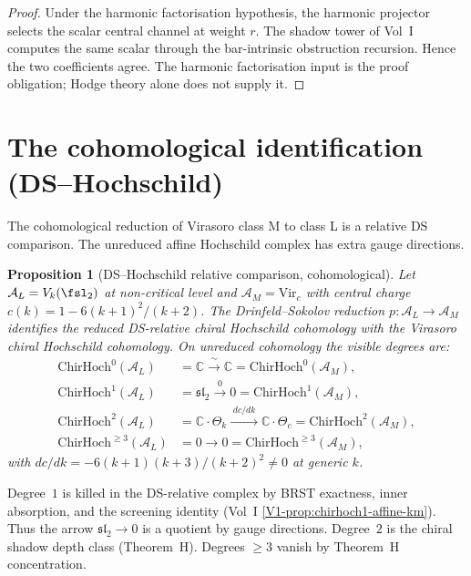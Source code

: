 \documentclass[11pt]{amsart}
\newtheorem{proposition}[theorem]{Proposition}
\theoremstyle{definition}
\theoremstyle{remark}
\providecommand{\ChirHoch}{\mathrm{ChirHoch}}
\providecommand{\cA}{\mathcal{A}}
\begin{document}
\begin{proof}
Under the harmonic factorisation hypothesis, the harmonic projector
selects the scalar central channel at weight $r$. The shadow tower of
Vol~I computes the same scalar through the bar-intrinsic obstruction
recursion. Hence the two coefficients agree. The harmonic
factorisation input is the proof obligation; Hodge theory alone does
not supply it.
\end{proof}

\section{The cohomological identification (DS--Hochschild)}
\label{sec:DS-Hochschild-cohom}

The cohomological reduction of Virasoro class M to class L is a
relative DS comparison.  The unreduced affine Hochschild complex has
extra gauge directions.

\begin{proposition}[DS--Hochschild relative comparison, cohomological]%
\label{prop:DS-Hochschild-cohom}%
Let $\cA_L = V_k(\fsl_2)$ at non-critical level and
$\cA_M = \mathrm{Vir}_c$ with central charge
$c(k) = 1 - 6(k+1)^2/(k+2)$. The Drinfeld--Sokolov reduction
$p\colon \cA_L \to \cA_M$ identifies the reduced DS-relative chiral
Hochschild cohomology with the Virasoro chiral Hochschild cohomology.
On unreduced cohomology the visible degrees are:
\begin{align*}
  \ChirHoch^0(\cA_L) &= \mathbb{C}
    \xrightarrow{\;\sim\;} \mathbb{C} = \ChirHoch^0(\cA_M), \\
  \ChirHoch^1(\cA_L) &= \mathfrak{sl}_2
    \xrightarrow{\;0\;} 0 = \ChirHoch^1(\cA_M), \\
  \ChirHoch^2(\cA_L) &= \mathbb{C} \cdot \Theta_k
    \xrightarrow{\;dc/dk\;} \mathbb{C} \cdot \Theta_c
    = \ChirHoch^2(\cA_M), \\
  \ChirHoch^{\ge 3}(\cA_L) &= 0 \to 0 = \ChirHoch^{\ge 3}(\cA_M),
\end{align*}
with $dc/dk = -6(k+1)(k+3)/(k+2)^2 \neq 0$ at generic $k$.
\end{proposition}

Degree~$1$ is killed in the DS-relative complex by BRST exactness,
inner absorption, and the screening identity (Vol~I
\ref*{V1-prop:chirhoch1-affine-km}).  Thus the arrow
$\mathfrak{sl}_2\to0$ is a quotient by gauge directions. Degree~$2$ is the chiral
shadow depth class (Theorem~H). Degrees $\ge 3$ vanish by Theorem~H
concentration.
\end{document}
